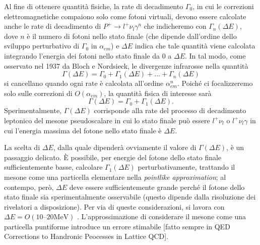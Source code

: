 \documentclass[LaM]{sapthesis}
\begin{document}
	Al fine di ottenere quantità fisiche, la rate di decadimento  $\Gamma_0$, in cui le correzioni elettromagnetiche compaiono solo come fotoni virtuali, devono essere calcolate anche le rate di decadimento di $P^+\to l^+\nu_l\gamma^n$ che indicheremo con $\Gamma_n(\Delta E)$, dove $n$ è il numero di fotoni nello stato finale (che dipende dall'ordine dello sviluppo perturbativo di $\Gamma_0$ in $\alpha_{em}$) e $\Delta E$ indica che tale quantità viene calcolata integrando l'energia dei fotoni nello stato finale da $0$ a $\Delta E$. In tal modo, come osservato nel 1937 da Bloch e Nordsieck, le divergenze infrarosse nella quantità
	$$
	\Gamma(\Delta E) = \Gamma_0 + \Gamma_1(\Delta E) + ... + \Gamma_n(\Delta E)
	$$
	si cancellano quando ogni rate è calcolata all'ordine $\alpha_{em}^n$. Poiché ci focalizzeremo solo sulle correzioni di $O(\alpha_{em})$, la quantità fisica di interesse sarà
	$$
	\Gamma(\Delta E) = \Gamma_0+\Gamma_1(\Delta E).
	$$
	Sperimentalmente, $\Gamma(\Delta E)$ corrisponde alla rate del processo di decadimento leptonico del mesone pseudoscalare in cui lo stato finale può essere $l^+\nu_l$ o $l^+\nu_l\gamma$ in cui l'energia massima del fotone nello stato finale è $\Delta E$.
	
	La scelta di $\Delta E$, dalla quale dipenderà ovviamente il valore di $\Gamma(\Delta E)$, è un passaggio delicato. È possibile, per energie del fotone dello stato finale sufficientemente basse, calcolare $\Gamma_1(\Delta E)$ perturbativamente, trattando il mesone come una particella elementare nella \emph{pointlike approximation}; al contempo, però, $\Delta E$ deve essere sufficientemente grande perché il fotone dello stato finale sia sperimentalmente osservabile (questo dipende dalla risoluzione dei rivelatori a disposizione). Per via di queste considerazioni, si lavora con 
	$\Delta E=O(\numrange{10}{20} \si{\mega\electronvolt})$
	. L'approssimazione di considerare il mesone come una particella puntiforme introduce un errore stimabile [\color{green}fatto sempre in QED Corrections to Handronic Peocesses in Lattice QCD\color{black}].
	
\end{document}
